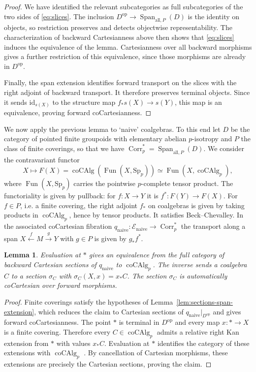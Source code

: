 \documentclass[11pt,a4paper]{article}
\newtheorem{lemma}[thm]{Lemma}
\theoremstyle{definition}
\newcommand{\Sp}{\mathrm{Sp}}
\newcommand{\op}{\mathrm{op}}
\newcommand{\coAlg}{\operatorname{coCAlg}}
\newcommand{\Fun}{\operatorname{Fun}}
\newcommand{\Span}{\operatorname{Span}}
\newcommand{\Corr}{\operatorname{Corr}_p}
\newcommand{\id}{\mathrm{id}}
\begin{document}
\begin{proof}
We have identified the relevant subcategories as full
subcategories of the two sides of \eqref{eq:slices}.
The inclusion $D^{\op}\to\Span_{\mathrm{all},P}(D)$ is the identity
on objects, so restriction preserves and detects objectwise
representability. The characterization of backward
Cartesianness above then shows that \eqref{eq:slices} induces
the equivalence of the lemma. Cartesianness over all backward morphisms gives a further
restriction of this equivalence, since those morphisms are already
in $D^{\op}$.

Finally, the span extension identifies forward transport on the
slices with the right adjoint of backward transport.
It therefore preserves terminal objects.
Since it sends $\id_{s(X)}$ to the structure map
$f_*s(X)\to s(Y)$, this map is an equivalence, proving forward
coCartesianness.
\end{proof}

We now apply the previous lemma to `naive' coalgebras. To this end let $D$ be the category of
pointed finite groupoids with elementary abelian $p$-isotropy and
$P$ the class of finite coverings, so that we have $\Corr^*=\Span_{\mathrm{all},P}(D)$.
We consider the contravariant functor 
\[
 X \mapsto F(X)=\coAlg(\Fun(X,\Sp_p)) \simeq \Fun(X,\coAlg_p),
\]
where $\Fun(X,\Sp_p)$ carries the pointwise $p$-complete tensor product.
The functoriality is given by pullback: for $f:X\to Y$ it is $f^*:F(Y)\to F(X)$.
For $f\in P$, i.e. a finite covering, the right adjoint $f_*$ on coalgebras is given
by taking products in $\coAlg_p$, hence by tensor
products. It satisfies Beck--Chevalley.
In the associated coCartesian fibration
$q_{\mathrm{naive}}:\mathcal E_{\mathrm{naive}}\to\Corr^*$ the transport along a span
 $X\xleftarrow{f}M\xrightarrow{g}Y$ with $g \in P$ is given by $g_*f^*$.

\begin{lemma}\label{lem:naive-sections-equivalence}
Evaluation at $*$ gives an equivalence from the full category
of backward Cartesian sections of $q_{\mathrm{naive}}$ to $\coAlg_p$.
The inverse sends a coalgebra $C$ to a section $\sigma_C$ with
$\sigma_C(X,x)=x_*C$. The section $\sigma_C$ is automatically
coCartesian over forward morphisms.
\end{lemma}

\begin{proof}
Finite coverings satisfy the hypotheses of
Lemma~\ref{lem:sections-span-extension}, which reduces the claim
to Cartesian sections of $q_{\mathrm{naive}}|_{D^{\op}}$
and gives forward coCartesianness.
The point $*$ is terminal in $D^{\op}$ and every map
$x:*\to X$ is a finite covering. Therefore every $C\in\coAlg_p$
admits a relative right Kan extension from $*$ with values $x_*C$.
Evaluation at $*$ identifies the category of these extensions
with $\coAlg_p$
\cite[Proposition~4.3.2.15 and Remark~4.3.2.18]{HTT}.
By cancellation of Cartesian morphisms, these extensions are
precisely the Cartesian sections, proving the claim.
\end{proof}
\end{document}
